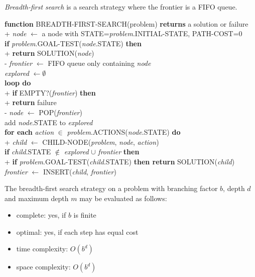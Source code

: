 \documentclass{article}
\begin{document}
\begin{definition}
    \emph{Breadth-first search} is a search strategy where
    the frontier is a FIFO queue.
    \begin{pseudo}
    \textbf{function} BREADTH-FIRST-SEARCH(problem) \textbf{returns} a solution or failure  \\+
        \emph{node} $\leftarrow$ a node with STATE=\emph{problem}.INITIAL-STATE, PATH-COST=0\\
        \textbf{if} \emph{problem}.GOAL-TEST(\emph{node}.STATE) \textbf{then}               \\+
            \textbf{return} SOLUTION(\emph{node})                                           \\-
        \emph{frontier} $\leftarrow$ FIFO queue only containing \emph{node}                 \\
        \emph{explored} $\leftarrow \emptyset$                                              \\
        \textbf{loop do}                                                                    \\+
            \textbf{if} EMPTY?(\emph{frontier}) \textbf{then}                               \\+
                \textbf{return} failure                                                     \\-
            \emph{node} $\leftarrow$ POP(\emph{frontier})                                   \\
            add \emph{node}.STATE to \emph{explored}                                        \\
            \textbf{for each} \emph{action} $\in$ \emph{problem}.ACTIONS(\emph{node}.STATE) \textbf{do}             \\+
                \emph{child} $\leftarrow$ CHILD-NODE(\emph{problem}, \emph{node}, \emph{action})                    \\
                \textbf{if} \emph{child}.STATE $\not\in$ \emph{explored} $\cup$ \emph{frontier} \textbf{then}       \\+
                \textbf{if} \emph{problem}.GOAL-TEST(\emph{child}.STATE) \textbf{then return} SOLUTION(\emph{child})\\
                \emph{frontier} $\leftarrow$ INSERT(\emph{child}, \emph{frontier})
    \end{pseudo}
\end{definition}

\begin{theorem}
    The breadth-first search strategy on a problem with branching factor $b$,
    depth $d$ and maximum depth $m$ may be evaluated as follows:
    \begin{itemize}
        \item complete: yes, if $b$ is finite
        \item optimal: yes, if each step has equal cost
        \item time complexity: $O(b^d)$
        \item space complexity: $O(b^d)$
    \end{itemize}
\end{theorem}
\end{document}
